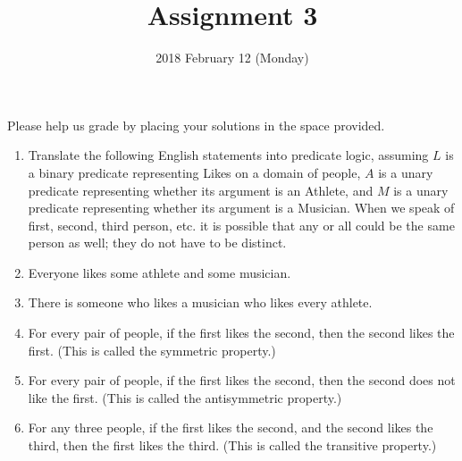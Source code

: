 \documentclass{cs81-homework}
\title{Assignment 3}
\author{}
\date{2018 February 12 (Monday)}
\begin{document}
\begin{introduction}
  \theintroduction

  Please help us grade by placing your solutions in the space provided.
\end{introduction}

\begin{enumerate}
\item[] Translate the following English statements into predicate logic,
  assuming \(L\) is a binary predicate representing Likes on a domain of people,
  \(A\) is a unary predicate representing whether its argument is an Athlete,
  and \(M\) is a unary predicate representing whether its argument is a
  Musician.  When we speak of first, second, third person, etc. it is possible
  that any or all could be the same person as well; they do not have to be
  distinct.
  
\item {} Everyone likes some athlete and some musician.

  \begin{solution*}
  \end{solution*}

\item {} There is someone who likes a musician who likes every athlete.

  \begin{solution*}
  \end{solution*}

\item {} For every pair of people, if the first likes the second, then the
  second likes the first. (This is called the symmetric property.)

  \begin{solution*}
  \end{solution*}

\item {} For every pair of people, if the first likes the second, then the
  second does not like the first. (This is called the antisymmetric property.)

  \begin{solution*}
  \end{solution*}

\item {} For any three people, if the first likes the second, and the
  second likes the third, then the first likes the third. (This is called the
  transitive property.)

  \begin{solution*}
  \end{solution*}


\end{enumerate}
\end{document}
